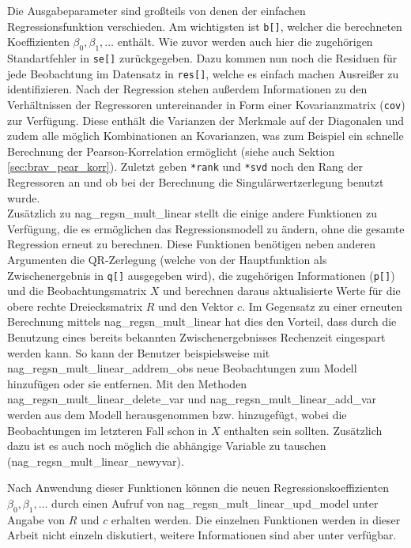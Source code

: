 Die Ausgabeparameter sind großteils von denen der einfachen Regressionsfunktion verschieden.
Am wichtigsten ist \lstinline{b[]}, welcher die berechneten Koeffizienten $\beta_0, \beta_1, \dots$ enthält.
Wie zuvor werden auch hier die zugehörigen Standartfehler in \lstinline{se[]} zurückgegeben.
Dazu kommen nun noch die Residuen für jede Beobachtung im Datensatz in \lstinline{res[]}, welche es einfach machen Ausreißer zu identifizieren.
Nach der Regression stehen außerdem Informationen zu den Verhältnissen der Regressoren untereinander in Form einer Kovarianzmatrix (\lstinline{cov}) zur Verfügung.
Diese enthält die Varianzen der Merkmale auf der Diagonalen und zudem alle möglich Kombinationen an Kovarianzen, was zum Beispiel ein schnelle Berechnung der Pearson-Korrelation ermöglicht (siehe auch Sektion \ref{sec:brav_pear_korr}).
Zuletzt geben \lstinline{*rank} und \lstinline{*svd} noch den Rang der Regressoren an und ob bei der Berechnung die Singulärwertzerlegung benutzt wurde.
\\

Zusätzlich zu nag\_regsn\_mult\_linear stellt die \naglib einige andere Funktionen zu Verfügung, die es ermöglichen das Regressionsmodell zu ändern, ohne die gesamte Regression erneut zu berechnen.
Diese Funktionen benötigen neben anderen Argumenten die QR-Zerlegung (welche von der Hauptfunktion als Zwischenergebnis in \lstinline{q[]} ausgegeben wird), die zugehörigen Informationen (\lstinline{p[]}) und die Beobachtungsmatrix $X$ und berechnen daraus aktualisierte Werte für die obere rechte Dreiecksmatrix $R$ und den Vektor $c$.
Im Gegensatz zu einer erneuten Berechnung mittels nag\_regsn\_mult\_linear hat dies den Vorteil, dass durch die Benutzung eines bereits bekannten Zwischenergebnisses Rechenzeit eingespart werden kann.
So kann der Benutzer beispielsweise mit nag\_regsn\_mult\_linear\_addrem\_obs neue Beobachtungen zum Modell hinzufügen oder sie entfernen.
Mit den Methoden nag\_regsn\_mult\_linear\_delete\_var und nag\_regsn\_mult\_linear\_add\_var werden aus dem Modell herausgenommen bzw. hinzugefügt, wobei die Beobachtungen im letzteren Fall schon in $X$ enthalten sein sollten.
Zusätzlich dazu ist es auch noch möglich die abhängige Variable zu tauschen (nag\_regsn\_mult\_linear\_newyvar).

Nach Anwendung dieser Funktionen können die neuen Regressionskoeffizienten $\beta_0, \beta_1, \dots$ durch einen Aufruf von nag\_regsn\_mult\_linear\_upd\_model unter Angabe von $R$ und $c$ erhalten werden.
Die einzelnen Funktionen werden in dieser Arbeit nicht einzeln diskutiert, weitere Informationen sind aber unter \citep{nag:contents} verfügbar.






